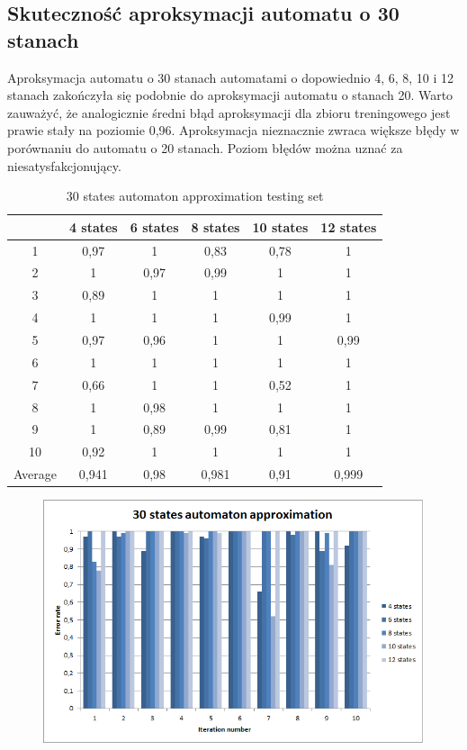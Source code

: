 \documentclass[runningheads,a4paper]{llncs}
\begin{document}
\FloatBarrier
\subsection{Skuteczność aproksymacji automatu o 30 stanach}

Aproksymacja automatu o 30 stanach automatami o dopowiednio 4, 6, 8, 10 i 12 stanach zakończyła się podobnie do aproksymacji automatu o stanach 20. Warto zauważyć, że analogicznie średni błąd aproksymacji dla zbioru treningowego jest prawie stały na poziomie 0,96. Aproksymacja nieznacznie zwraca większe błędy w porównaniu do automatu o 20 stanach. Poziom błędów można uznać za niesatysfakcjonujący.  \\

\begin{table}[]
\centering
\caption{30 states automaton approximation testing set}
\label{my-label}
\begin{tabular}{@{}cccccc@{}}
\toprule
        & 4 states & 6 states & 8 states & 10 states & 12 states    \\ \midrule
1       & 0,97     & 1        & 0,83     & 0,78      & 1 \\
2       & 1        & 0,97     & 0,99     & 1         & 1 \\
3       & 0,89     & 1        & 1        & 1         & 1 \\
4       & 1        & 1        & 1        & 0,99      & 1   \\
5       & 0,97     & 0,96     & 1        & 1         & 0,99   \\
6       & 1        & 1        & 1        & 1         & 1    \\
7       & 0,66     & 1        & 1        & 0,52      & 1    \\
8       & 1        & 0,98     & 1        & 1         & 1     \\
9       & 1        & 0,89     & 0,99     & 0,81      & 1 \\
10      & 0,92     & 1        & 1        & 1         & 1  \\
Average & 0,941    & 0,98     & 0,981    & 0,91      & 0,999  \\ \bottomrule
\end{tabular}
\end{table}

\begin{figure}
\centering
\includegraphics[scale=1]{3.png}
\end{figure}
\end{document}
